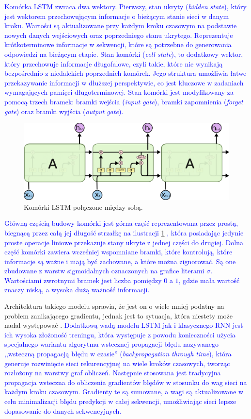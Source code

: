 \documentclass[data-science]{agh-wi} %
\begin{document}
\textcolor{blue}{Komórka LSTM zwraca dwa wektory. Pierwszy, stan ukryty (\textit{hidden state}), który jest wektorem przechowującym informacje o bieżącym stanie sieci w danym kroku. Wartości są aktualizowane przy każdym kroku czasowym na podstawie nowych danych wejściowych oraz poprzedniego stanu ukrytego. Reprezentuje krótkoterminowe informacje w sekwencji, które są potrzebne do generowania odpowiedzi na bieżącym etapie. Stan komórki (\textit{cell state}), to dodatkowy wektor, który przechowuje informacje długofalowe, czyli takie, które nie wynikają bezpośrednio z niedalekich poprzednich komórek. Jego struktura umożliwia łatwe przekazywanie informacji w dłuższej perspektywie, co jest kluczowe w zadaniach wymagających pamięci długoterminowej. Stan komórki jest modyfikowany za pomocą trzech bramek: bramki wejścia (\textit{input gate}), bramki zapomnienia (\textit{forget gate}) oraz bramki wyjścia (\textit{output gate}).}

\begin{figure}[ht!]
    \begin{center}
        \includegraphics[width=0.6\linewidth]{./img/LSTM3-chain.png}
    \end{center}
    \caption{Komórki LSTM połączone między sobą.}\label{fig:lstm_chain}
\end{figure}

\textcolor{blue}{Główną częścią budowy komórki jest górna część reprezentowana przez prostą, biegnącą przez całą jej długość strzałkę na ilustracji \ref*{fig:lstm_chain} \cite{Understanding_lstm}, która posiadając jedynie proste operacje liniowe przekazuje stany ukryte z jednej części do drugiej. Dolna część komórki zawiera wcześniej wspomniane bramki, które kontrolują, które informacje są ważne i mają być zachowane, a które można zignorować. Są one zbudowane z warstw sigmoidalnych oznaczonych na grafice literami $\sigma$. Wartościami zwrotnymi \textcolor{blue}{bramek} jest liczba pomiędzy $0$ a $1$, gdzie mała wartość znaczy niską, a wysoka dużą ważność informacji.} 

Architektura takiego modelu sprawia, że jest on o wiele mniej podatny na problem zanikającego gradientu, jednak jest to sytuacja, która niestety może nadal występować \cite{vanishing_gradient}. \textcolor{blue}{Dodatkową wadą modelu LSTM jak i klasycznego RNN jest ich wysoka złożoność treningu, która występuje z powodu konieczności użycia specjalnego wariantu algorytmu wstecznej propagacji błędu nazywanego ,,wsteczną propagacją błędu w czasie'' (\textit{backpropagation through time}), która generuje rozwinięcie sieci rekurencyjnej na wiele kroków czasowych, tworząc rozłożony na warstwy graf obliczeń. Następnie stosowana jest tradycyjna propagacja wsteczna do obliczenia gradientów błędów w stosunku do wag sieci na każdym kroku czasowym. Gradienty te są sumowane, a wagi są aktualizowane w celu minimalizacji błędu predykcji w całej sekwencji, umożliwiając sieci lepsze dopasowanie do danych sekwencyjnych.}
\end{document}
